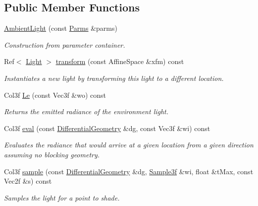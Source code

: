 \subsection*{Public Member Functions}
\begin{DoxyCompactItemize}
\item 
\hyperlink{classembree_1_1_ambient_light_a1d489bf4692762990e731286731d56e3}{AmbientLight} (const \hyperlink{classembree_1_1_parms}{Parms} \&parms)
\begin{DoxyCompactList}\small\item\em Construction from parameter container. \item\end{DoxyCompactList}\item 
Ref$<$ \hyperlink{classembree_1_1_light}{Light} $>$ \hyperlink{classembree_1_1_ambient_light_a7b9faa7bc4b88e2007fd9bba14d9f691}{transform} (const AffineSpace \&xfm) const 
\begin{DoxyCompactList}\small\item\em Instantiates a new light by transforming this light to a different location. \item\end{DoxyCompactList}\item 
Col3f \hyperlink{classembree_1_1_ambient_light_a5bddffd418bf303eeccc184477b8a9bf}{Le} (const Vec3f \&wo) const 
\begin{DoxyCompactList}\small\item\em Returns the emitted radiance of the environment light. \item\end{DoxyCompactList}\item 
Col3f \hyperlink{classembree_1_1_ambient_light_a49bdb098ba60b92fb1ebeeac33715ab7}{eval} (const \hyperlink{structembree_1_1_differential_geometry}{DifferentialGeometry} \&dg, const Vec3f \&wi) const 
\begin{DoxyCompactList}\small\item\em Evaluates the radiance that would arrive at a given location from a given direction assuming no blocking geometry. \item\end{DoxyCompactList}\item 
Col3f \hyperlink{classembree_1_1_ambient_light_aa733e3f68cd95ce4ff533facfa73df68}{sample} (const \hyperlink{structembree_1_1_differential_geometry}{DifferentialGeometry} \&dg, \hyperlink{structembree_1_1_sample}{Sample3f} \&wi, float \&tMax, const Vec2f \&s) const 
\begin{DoxyCompactList}\small\item\em Samples the light for a point to shade. \item\end{DoxyCompactList}\item 

\end{DoxyCompactItemize}
